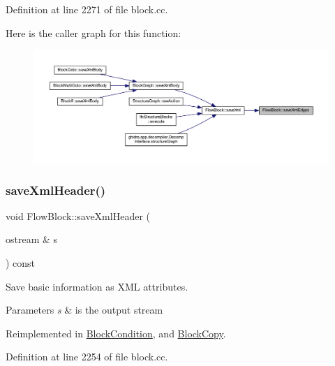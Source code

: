 Definition at line 2271 of file block.\+cc.

Here is the caller graph for this function\+:
\nopagebreak
\begin{figure}[H]
\begin{center}
\leavevmode
\includegraphics[width=350pt]{class_flow_block_a5b6c4638bc1ca5fa47c33fe2ca0e1696_icgraph}
\end{center}
\end{figure}
\mbox{\label{class_flow_block_a6cf95f66e3f6940a8342b3e6fdfc5ca2}} 
\subsubsection{\texorpdfstring{saveXmlHeader()}{saveXmlHeader()}}
{\footnotesize\ttfamily void Flow\+Block\+::save\+Xml\+Header (\begin{DoxyParamCaption}\item[{ostream \&}]{s }\end{DoxyParamCaption}) const\hspace{0.3cm}{\ttfamily [virtual]}}



Save basic information as X\+ML attributes. 


\begin{DoxyParams}{Parameters}
{\em s} & is the output stream \\
\hline
\end{DoxyParams}


Reimplemented in \mbox{\hyperlink{class_block_condition_a1e24ce75951cb7a66b281eeabe7854c0}{Block\+Condition}}, and \mbox{\hyperlink{class_block_copy_a67aa0188bb62e91052092088eeec70ed}{Block\+Copy}}.



Definition at line 2254 of file block.\+cc.

